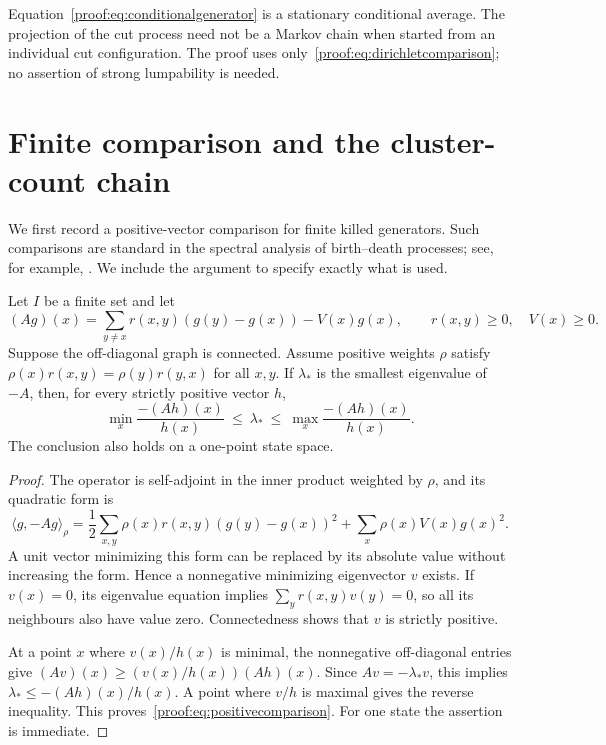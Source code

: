 \begin{remark}\label{proof:rem:averaging}
Equation~\eqref{proof:eq:conditionalgenerator} is a stationary
conditional average. The projection of the cut process need not be a
Markov chain when started from an individual cut configuration. The
proof uses only~\eqref{proof:eq:dirichletcomparison}; no assertion of
strong lumpability is needed.
\end{remark}

\section{Finite comparison and the cluster-count chain}
\label{proof:sec:count}

We first record a positive-vector comparison for finite killed
generators. Such comparisons are standard in the spectral analysis of
birth--death processes; see, for example, \cite{Zeifman1991}. We include
the argument to specify exactly what is used.

\begin{lemma}\label{proof:lem:positive}
Let $I$ be a finite set and let
\[
 (Ag)(x)=\sum_{y\neq x}r(x,y)(g(y)-g(x))-V(x)g(x),
 \qquad r(x,y)\geq0,\quad V(x)\geq0.
\]
Suppose the off-diagonal graph is connected. Assume positive weights
$\rho$ satisfy $\rho(x)r(x,y)=\rho(y)r(y,x)$ for all $x,y$.
If $\lambda_*$ is the smallest eigenvalue
of $-A$, then, for every strictly positive vector $h$,
\begin{equation}\label{proof:eq:positivecomparison}
 \min_x\frac{-(Ah)(x)}{h(x)}
 \ \leq\ \lambda_*\ \leq\
 \max_x\frac{-(Ah)(x)}{h(x)}.
\end{equation}
The conclusion also holds on a one-point state space.
\end{lemma}

\begin{proof}
The operator is self-adjoint in the inner product weighted by $\rho$,
and its quadratic form is
\[
 \langle g,-Ag\rangle_\rho
 =\frac12\sum_{x,y}\rho(x)r(x,y)(g(y)-g(x))^2
   +\sum_x\rho(x)V(x)g(x)^2.
\]
A unit vector minimizing this form can be replaced by its absolute
value without increasing the form. Hence a nonnegative minimizing
eigenvector $v$ exists. If $v(x)=0$, its eigenvalue equation implies
$\sum_y r(x,y)v(y)=0$, so all its neighbours also have value zero.
Connectedness shows that $v$ is strictly positive.

At a point $x$ where $v(x)/h(x)$ is minimal, the nonnegative
off-diagonal entries give
$(Av)(x)\geq(v(x)/h(x))(Ah)(x)$. Since $Av=-\lambda_*v$, this implies
$\lambda_*\leq-(Ah)(x)/h(x)$. A point where $v/h$ is maximal gives
the reverse inequality. This proves~\eqref{proof:eq:positivecomparison}.
For one state the assertion is immediate.
\end{proof}

